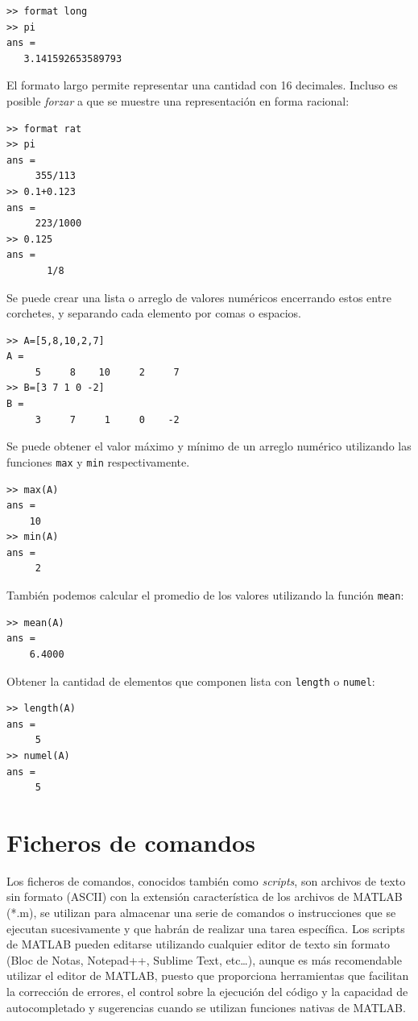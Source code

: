 \begin{verbatim}
>> format long
>> pi
ans =
   3.141592653589793
\end{verbatim}

El formato largo permite representar una cantidad con 16 decimales. Incluso es posible \textit{forzar} 
a que se muestre una representación en forma racional:

\begin{verbatim}
>> format rat
>> pi
ans =
     355/113   
>> 0.1+0.123
ans =
     223/1000  
>> 0.125
ans =
       1/8
\end{verbatim}

Se puede crear una lista o arreglo de valores numéricos encerrando estos entre corchetes, 
y separando cada elemento por comas o espacios.

\begin{verbatim}
>> A=[5,8,10,2,7]
A =
     5     8    10     2     7
>> B=[3 7 1 0 -2]
B =
     3     7     1     0    -2
\end{verbatim}

Se puede obtener el valor máximo y mínimo de un arreglo numérico utilizando las funciones \texttt{max} y 
\texttt{min} respectivamente.

\begin{verbatim}
>> max(A)
ans =
    10
>> min(A)
ans =
     2
\end{verbatim}

También podemos calcular el promedio de los valores utilizando la función \texttt{mean}:

\begin{verbatim}
>> mean(A)
ans =
    6.4000
\end{verbatim}

Obtener la cantidad de elementos que componen lista con \texttt{length} o \texttt{numel}:

\begin{verbatim}
>> length(A)
ans =
     5
>> numel(A)
ans =
     5
\end{verbatim}


\section{Ficheros de comandos}

Los ficheros de comandos, conocidos también como \textit{scripts}, son archivos de texto sin formato 
(ASCII) con la extensión característica de los archivos de MATLAB (*.m), se utilizan para 
almacenar una serie de comandos o instrucciones que se ejecutan sucesivamente y que habrán 
de realizar una tarea específica. Los scripts de MATLAB pueden editarse utilizando cualquier 
editor de texto sin formato (Bloc de Notas, Notepad++, Sublime Text, etc…), aunque es más 
recomendable utilizar el editor de MATLAB, puesto que proporciona herramientas que facilitan 
la corrección de errores, el control sobre la ejecución del código y la capacidad de 
autocompletado y sugerencias cuando se utilizan funciones nativas de MATLAB.\\

